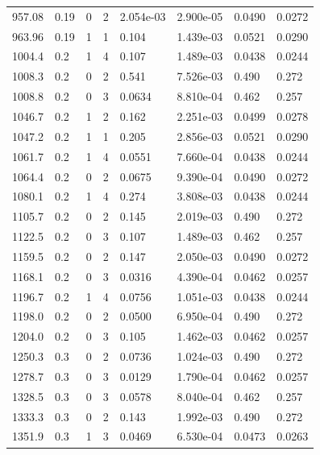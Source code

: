 \documentclass[preview]{standalone}
\begin{document}
{{{\begin{tabular}{L{1.2cm}C{1.2cm} C{0.3cm}C{0.5cm} C{1.4cm}C{1.4cm} C{1.4cm}C{1.4cm}}
  957.08  &  0.19  & 0     &  2 &  2.054e-03  & 2.900e-05  & 0.0490 &  0.0272   \\ 
  963.96  &  0.19  & 1     &  1 &  0.104  & 1.439e-03  & 0.0521 &  0.0290   \\ 
  1004.4  &   0.2  & 1     &  4 &  0.107  & 1.489e-03  & 0.0438 &  0.0244   \\ 
  1008.3  &   0.2  & 0     &  2 &  0.541  & 7.526e-03  & 0.490 &  0.272   \\ 
  1008.8  &   0.2  & 0     &  3 &  0.0634  & 8.810e-04  & 0.462 &  0.257   \\ 
  1046.7  &   0.2  & 1     &  2 &  0.162  & 2.251e-03  & 0.0499 &  0.0278   \\ 
  1047.2  &   0.2  & 1     &  1 &  0.205  & 2.856e-03  & 0.0521 &  0.0290   \\ 
  1061.7  &   0.2  & 1     &  4 &  0.0551  & 7.660e-04  & 0.0438 &  0.0244   \\ 
  1064.4  &   0.2  & 0     &  2 &  0.0675  & 9.390e-04  & 0.0490 &  0.0272   \\ 
  1080.1  &   0.2  & 1     &  4 &  0.274  & 3.808e-03  & 0.0438 &  0.0244   \\ 
  1105.7  &   0.2  & 0     &  2 &  0.145  & 2.019e-03  & 0.490 &  0.272   \\ 
  1122.5  &   0.2  & 0     &  3 &  0.107  & 1.489e-03  & 0.462 &  0.257   \\ 
  1159.5  &   0.2  & 0     &  2 &  0.147  & 2.050e-03  & 0.0490 &  0.0272   \\ 
  1168.1  &   0.2  & 0     &  3 &  0.0316  & 4.390e-04  & 0.0462 &  0.0257   \\ 
  1196.7  &   0.2  & 1     &  4 &  0.0756  & 1.051e-03  & 0.0438 &  0.0244   \\ 
  1198.0  &   0.2  & 0     &  2 &  0.0500  & 6.950e-04  & 0.490 &  0.272   \\ 
  1204.0  &   0.2  & 0     &  3 &  0.105  & 1.462e-03  & 0.0462 &  0.0257   \\ 
  1250.3  &   0.3  & 0     &  2 &  0.0736  & 1.024e-03  & 0.490 &  0.272   \\ 
  1278.7  &   0.3  & 0     &  3 &  0.0129  & 1.790e-04  & 0.0462 &  0.0257   \\ 
  1328.5  &   0.3  & 0     &  3 &  0.0578  & 8.040e-04  & 0.462 &  0.257   \\ 
  1333.3  &   0.3  & 0     &  2 &  0.143  & 1.992e-03  & 0.490 &  0.272   \\ 
  1351.9  &   0.3  & 1     &  3 &  0.0469  & 6.530e-04  & 0.0473 &  0.0263   \\ 

\end{tabular}}}}
\end{document}

